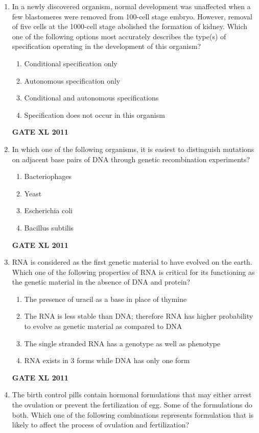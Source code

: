 \documentclass[journal,12pt,onecolumn]{IEEEtran}
\begin{document}
\begin{enumerate}
\item {In a newly discovered organism, normal development was unaffected when a few blastomeres were removed from 100-cell stage embryo. However, removal of five cells at the 1000-cell stage abolished the formation of kidney. Which one of the following options most accurately describes the type(s) of specification operating in the development of this organism?}
\begin{enumerate}
	\item Conditional specification only
	\item Autonomous specification only
	\item Conditional and autonomous specifications
	\item Specification does not occur in this organism
\end{enumerate}
\hfill{\textbf{GATE XL 2011}}

\item{ In which one of the following organisms, it is easiest to distinguish mutations on adjacent base pairs of DNA through genetic recombination experiments?}

\begin{enumerate}
	\item Bacteriophages
	\item Yeast
	\item Escherichia coli
	\item Bacillus subtilis
\end{enumerate}
\hfill{\textbf{GATE XL 2011}}

\item{ RNA is considered as the first genetic material to have evolved on the earth. Which one of the following properties of RNA is critical for its functioning as the genetic material in the absence of DNA and protein?}

\begin{enumerate}
	\item The presence of uracil as a base in place of thymine
	\item The RNA is less stable than DNA; therefore RNA has higher probability to evolve as genetic material as compared to DNA
	\item The single stranded RNA has a genotype as well as phenotype
	\item RNA exists in 3 forms while DNA has only one form
\end{enumerate}
\hfill{\textbf{GATE XL 2011}}

\item{ The birth control pills contain hormonal formulations that may either arrest the ovulation or prevent the fertilization of egg. Some of the formulations do both. Which one of the following combinations represents formulation that is likely to affect the process of ovulation and fertilization?}


\end{enumerate}
\end{document}
